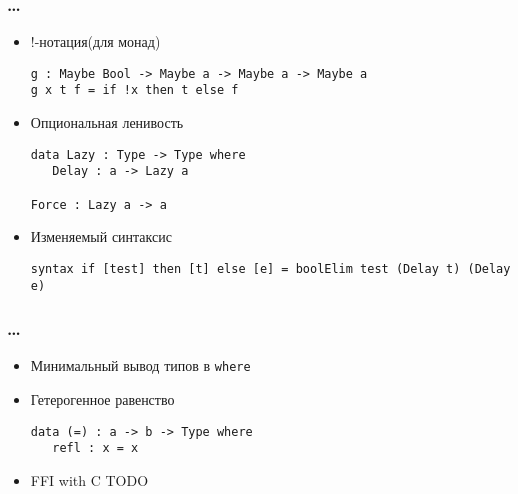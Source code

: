 \begin{frame}[fragile]
   \frametitle{\dots}
   \begin{itemize}
   \item !-нотация(для монад)
         \begin{lstlisting}
g : Maybe Bool -> Maybe a -> Maybe a -> Maybe a
g x t f = if !x then t else f
         \end{lstlisting}
   \item Опциональная ленивость
         \begin{lstlisting}
data Lazy : Type -> Type where
   Delay : a -> Lazy a

Force : Lazy a -> a
         \end{lstlisting}
   \item Изменяемый синтаксис
         \begin{lstlisting}
syntax if [test] then [t] else [e] = boolElim test (Delay t) (Delay e)
         \end{lstlisting}
   \end{itemize}
\end{frame}

\begin{frame}[fragile]
   \frametitle{\dots}
   \begin{itemize}
   \item Минимальный вывод типов в \texttt{\color{kwcolor}where}
   \item Гетерогенное равенство
      \begin{lstlisting}
data (=) : a -> b -> Type where
   refl : x = x
      \end{lstlisting}
   \item FFI with C
      TODO
   \end{itemize}
\end{frame}

